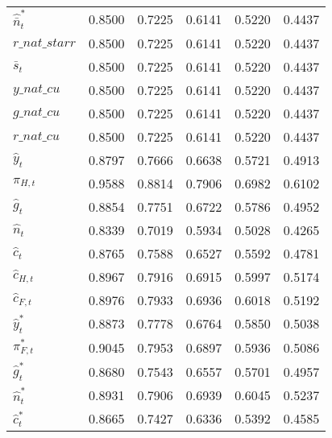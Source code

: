 \begin{center}
\begin{longtable}{lccccc}
${\hat {\bar n}_t^*}      $	 & 	    0.8500	 & 	    0.7225	 & 	    0.6141	 & 	    0.5220	 & 	    0.4437 \\ 
$r\_nat\_starr            $	 & 	    0.8500	 & 	    0.7225	 & 	    0.6141	 & 	    0.5220	 & 	    0.4437 \\ 
${\bar s_t}               $	 & 	    0.8500	 & 	    0.7225	 & 	    0.6141	 & 	    0.5220	 & 	    0.4437 \\ 
$y\_nat\_cu               $	 & 	    0.8500	 & 	    0.7225	 & 	    0.6141	 & 	    0.5220	 & 	    0.4437 \\ 
$g\_nat\_cu               $	 & 	    0.8500	 & 	    0.7225	 & 	    0.6141	 & 	    0.5220	 & 	    0.4437 \\ 
$r\_nat\_cu               $	 & 	    0.8500	 & 	    0.7225	 & 	    0.6141	 & 	    0.5220	 & 	    0.4437 \\ 
${\hat y_t}               $	 & 	    0.8797	 & 	    0.7666	 & 	    0.6638	 & 	    0.5721	 & 	    0.4913 \\ 
${\pi_{H,t}}              $	 & 	    0.9588	 & 	    0.8814	 & 	    0.7906	 & 	    0.6982	 & 	    0.6102 \\ 
${\hat g_t}               $	 & 	    0.8854	 & 	    0.7751	 & 	    0.6722	 & 	    0.5786	 & 	    0.4952 \\ 
${\hat n_t}               $	 & 	    0.8339	 & 	    0.7019	 & 	    0.5934	 & 	    0.5028	 & 	    0.4265 \\ 
${\hat c_t}               $	 & 	    0.8765	 & 	    0.7588	 & 	    0.6527	 & 	    0.5592	 & 	    0.4781 \\ 
${\hat c_{H,t}}           $	 & 	    0.8967	 & 	    0.7916	 & 	    0.6915	 & 	    0.5997	 & 	    0.5174 \\ 
${\hat c_{F,t}}           $	 & 	    0.8976	 & 	    0.7933	 & 	    0.6936	 & 	    0.6018	 & 	    0.5192 \\ 
${\hat y_t^*}             $	 & 	    0.8873	 & 	    0.7778	 & 	    0.6764	 & 	    0.5850	 & 	    0.5038 \\ 
${\pi_{F,t}^*}            $	 & 	    0.9045	 & 	    0.7953	 & 	    0.6897	 & 	    0.5936	 & 	    0.5086 \\ 
${\hat g_t^*}             $	 & 	    0.8680	 & 	    0.7543	 & 	    0.6557	 & 	    0.5701	 & 	    0.4957 \\ 
${\hat n_t^*}             $	 & 	    0.8931	 & 	    0.7906	 & 	    0.6939	 & 	    0.6045	 & 	    0.5237 \\ 
${\hat c_t^*}             $	 & 	    0.8665	 & 	    0.7427	 & 	    0.6336	 & 	    0.5392	 & 	    0.4585 \\ 

\end{longtable}
\end{center}
